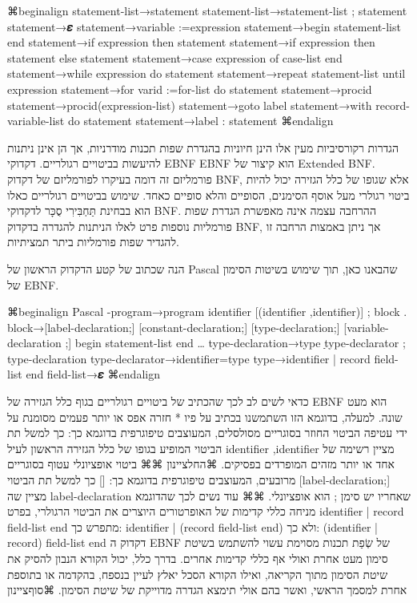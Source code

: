      ⌘begin{align}
statement-list→statement
statement-list→statement-list ; statement
statement→𝜺
statement→variable :=expression
statement→begin statement-list end
statement→if expression then statement
statement→if expression then statement else statement
statement→case expression of case-list end
statement→while expression do statement
statement→repeat statement-list until expression
statement→for varid :=for-list do statement
statement→procid
statement→procid(expression-list)
statement→goto label
statement→with record-variable-list do statement
statement→label : statement
      ⌘end{align}

      הגדרות רקורסיביות מעין אלו הינן חיוניות בהגדרת שפות תכנות מודרניות, אך הן אינן
      ניתנות להיעשות בביטויים רגולריים. דקדוקי EBNF EBNF הוא קיצור של Extended BNF.
      פורמליזם זה דומה בעיקרו לפורמליזם של דקדוק BNF, אלא שגופו של כלל הגזירה יכול
      להיות ביטוי רגולרי מעל אוסף הסימנים, הסופיים והלא סופיים כאחד. שימוש בביטויים
      רגולריים כאלו הוא בבחינת תַּחְבִּירִי סֻכָּר לדקדוקי BNF. ההרחבה עצמה אינה מאפשרת
      הגדרת שפות פורמליות נוספות פרט לאלו הניתנות להגדרה בדקדוק BNF, אך ניתן באמצות
      הרחבה זו להגדיר שפות פורמליות ביתר תמציתיות.

      הנה שכתוב של קטע הדקדוק הראשון של Pascal שהבאנו כאן, תוך שימוש בשיטות הסימון
      של EBNF.

      ⌘begin{align}
Pascal -program→program identifier [(identifier {,identifier})] ; block .
block→[label-declaration;]
               [constant-declaration;]
               [type-declaration;]
               [variable-declaration ;]
      begin statement-list end
…
type-declaration→type ַtype-declarator {; type-declaration}
type-declarator→identifier=type
type→identifier | record field-list end
field-list→𝜺
      ⌘end{align}

      כדאי לשים לב לכך שהכתיב של ביטויים רגולריים בגוף כלל הגזירה של EBNF הוא מעט
      שונה. למעלה, בדוגמא הזו השתמשנו בכתיב על פיו * חזרה אפס או יותר פעמים מסומנת על
      ידי עטיפה הביטוי החוזר בסוגריים מסולסלים, המעוצבים טיפוגרפית בדוגמא כך: {} כך
      למשל תת הביטוי המופיע בגופו של כלל הגזירה הראשון לעיל
      identifier {,identifier}
      מציין רשימה של אחד או יותר מזהים המופרדים בפסיקים.
      ⌘החל{ציינון}
      ⌘⌘ ביטוי אופציונלי עטוף בסוגריים מרובעים, המעוצבים טיפוגרפית בדוגמא כך: [] כך למשל תת הביטוי
      [label-declaration;]
      מציין שה label-declaration שאחריו יש סימן ; הוא אופציונלי.
      ⌘⌘ עוד נשים לכך שהדוגמא מניחה כללי קדימות של האופרטורים היוצרים את הביטוי הרגולרי, בפרט
      identifier | record field-list end
      מתפרש כך:
      identifier | (record field-list end)
      ולא כך:
      (identifier | record) field-list end
      דקדוק ה EBNF של שְׂפַת תכנות מסוימת עשוי להשתמש בשיטת סימון מעט אחרת ואולי אף כללי קדימות אחרים. בדרך כלל, יכול הקורא הנבון להסיק את שיטת הסימון מתוך הקריאה, ואילו הקורא הסכל יאלץ לעיין בנספח, בהקדמה או בתוספת אחרת למסמך הראשי, ואשר בהם אולי תימצא הגדרה מדוייקת של שיטת הסימון.
  ⌘סוף{ציינון}
